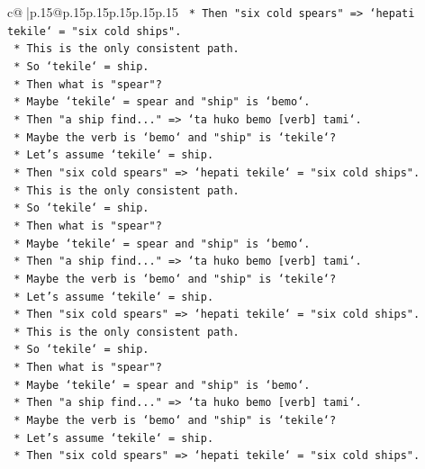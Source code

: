 \documentclass{article}
\begin{document}
{\begin{supertabular}{c@{$\;$}|p{.15\linewidth}@{}p{.15\linewidth}p{.15\linewidth}p{.15\linewidth}p{.15\linewidth}p{.15\linewidth}}
{{{\texttt{            *   Then "six cold spears" => `hepati tekile` = "six cold ships".} \\
\texttt{            *   This is the only consistent path.} \\
\texttt{            *   So `tekile` = ship.} \\
\texttt{            *   Then what is "spear"?} \\
\texttt{            *   Maybe `tekile` = spear and "ship" is `bemo`.} \\
\texttt{            *   Then "a ship find..." => `ta huko bemo {[}verb{]} tami`.} \\
\texttt{            *   Maybe the verb is `bemo` and "ship" is `tekile`?} \\
\texttt{            *   Let's assume `tekile` = ship.} \\
\texttt{            *   Then "six cold spears" => `hepati tekile` = "six cold ships".} \\
\texttt{            *   This is the only consistent path.} \\
\texttt{            *   So `tekile` = ship.} \\
\texttt{            *   Then what is "spear"?} \\
\texttt{            *   Maybe `tekile` = spear and "ship" is `bemo`.} \\
\texttt{            *   Then "a ship find..." => `ta huko bemo {[}verb{]} tami`.} \\
\texttt{            *   Maybe the verb is `bemo` and "ship" is `tekile`?} \\
\texttt{            *   Let's assume `tekile` = ship.} \\
\texttt{            *   Then "six cold spears" => `hepati tekile` = "six cold ships".} \\
\texttt{            *   This is the only consistent path.} \\
\texttt{            *   So `tekile` = ship.} \\
\texttt{            *   Then what is "spear"?} \\
\texttt{            *   Maybe `tekile` = spear and "ship" is `bemo`.} \\
\texttt{            *   Then "a ship find..." => `ta huko bemo {[}verb{]} tami`.} \\
\texttt{            *   Maybe the verb is `bemo` and "ship" is `tekile`?} \\
\texttt{            *   Let's assume `tekile` = ship.} \\
\texttt{            *   Then "six cold spears" => `hepati tekile` = "six cold ships".} \\
}}}
\end{supertabular}}
\end{document}
